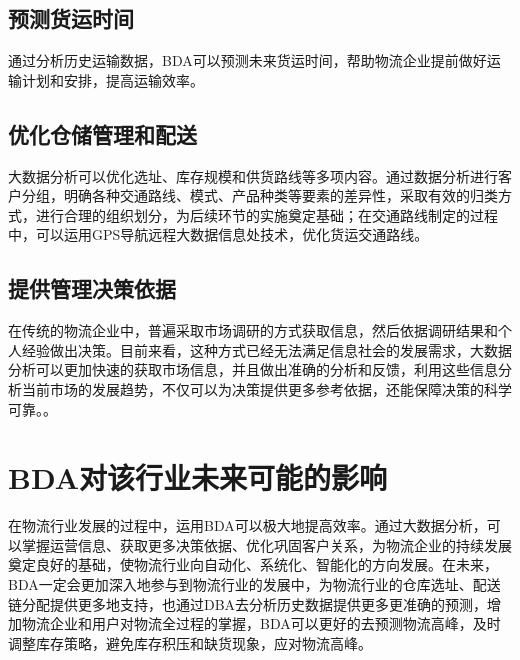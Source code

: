 \subsection{预测货运时间}
通过分析历史运输数据，BDA可以预测未来货运时间，帮助物流企业提前做好运输计划和安排，提高运输效率。

\subsection{优化仓储管理和配送}
大数据分析可以优化选址、库存规模和供货路线等多项内容。通过数据分析进行客户分组，明确各种交通路线、模式、产品种类等要素的差异性，采取有效的归类方式，进行合理的组织划分，为后续环节的实施奠定基础；在交通路线制定的过程中，可以运用GPS导航远程大数据信息处技术，优化货运交通路线\cite{2}。

\subsection{提供管理决策依据}
在传统的物流企业中，普遍采取市场调研的方式获取信息，然后依据调研结果和个人经验做出决策。目前来看，这种方式已经无法满足信息社会的发展需求，大数据分析可以更加快速的获取市场信息，并且做出准确的分析和反馈，利用这些信息分析当前市场的发展趋势，不仅可以为决策提供更多参考依据，还能保障决策的科学可靠。\cite{2}。


\section{BDA对该行业未来可能的影响}
在物流行业发展的过程中，运用BDA可以极大地提高效率。通过大数据分析，可以掌握运营信息、获取更多决策依据、优化巩固客户关系，为物流企业的持续发展奠定良好的基础，使物流行业向自动化、系统化、智能化的方向发展。在未来，BDA一定会更加深入地参与到物流行业的发展中，为物流行业的仓库选址、配送链分配提供更多地支持，也通过DBA去分析历史数据提供更多更准确的预测，增加物流企业和用户对物流全过程的掌握，BDA可以更好的去预测物流高峰，及时调整库存策略，避免库存积压和缺货现象，应对物流高峰。
    
    